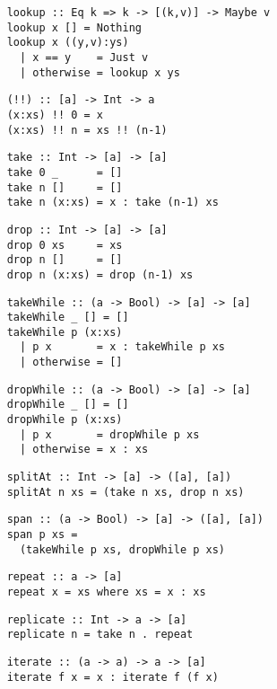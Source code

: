 \begin{multicols}{2}
	\begin{verbatim}
	lookup :: Eq k => k -> [(k,v)] -> Maybe v
	lookup x [] = Nothing
	lookup x ((y,v):ys)
	  | x == y    = Just v
	  | otherwise = lookup x ys
	\end{verbatim}
	
	\begin{verbatim}
	(!!) :: [a] -> Int -> a
	(x:xs) !! 0 = x
	(x:xs) !! n = xs !! (n-1)
	\end{verbatim}
	
	\begin{verbatim}
	take :: Int -> [a] -> [a]
	take 0 _      = []
	take n []     = []
	take n (x:xs) = x : take (n-1) xs
	\end{verbatim}
	
	\begin{verbatim}
	drop :: Int -> [a] -> [a]
	drop 0 xs     = xs 
	drop n []     = []
	drop n (x:xs) = drop (n-1) xs
	\end{verbatim}
	
	\begin{verbatim}
	takeWhile :: (a -> Bool) -> [a] -> [a]
	takeWhile _ [] = []
	takeWhile p (x:xs) 
	  | p x       = x : takeWhile p xs
	  | otherwise = []
	\end{verbatim}
	
	\begin{verbatim}
	dropWhile :: (a -> Bool) -> [a] -> [a]
	dropWhile _ [] = []
	dropWhile p (x:xs) 
	  | p x       = dropWhile p xs
	  | otherwise = x : xs
	\end{verbatim}
	
	\begin{verbatim}
	splitAt :: Int -> [a] -> ([a], [a])
	splitAt n xs = (take n xs, drop n xs)
	\end{verbatim}
	
	\begin{verbatim}
	span :: (a -> Bool) -> [a] -> ([a], [a])
	span p xs = 
	  (takeWhile p xs, dropWhile p xs)
	\end{verbatim}
	
	\begin{verbatim}
	repeat :: a -> [a]
	repeat x = xs where xs = x : xs
	\end{verbatim}
	
	\begin{verbatim}
	replicate :: Int -> a -> [a]
	replicate n = take n . repeat
	\end{verbatim}
	
	\begin{verbatim}
	iterate :: (a -> a) -> a -> [a]
	iterate f x = x : iterate f (f x)
	\end{verbatim}
	

\end{multicols}
